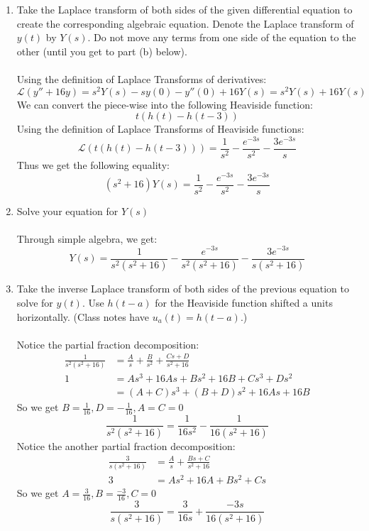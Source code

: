 \documentclass[12pt]{article}
\begin{document}
\begin{enumerate}[label = (\alph*)]
	\item Take the Laplace transform of both sides of the given differential equation to create the corresponding algebraic equation. Denote the Laplace transform of $y(t)$ by $Y(s)$. Do not move any terms from one side of the equation to the other (until you get to part (b) below).
	\\ \\
	Using the definition of Laplace Transforms of derivatives:
	$$
	\mathcal{L}(y'' + 16y) = s^2Y(s) - sy(0) - y''(0) + 16Y(s) = s^2Y(s) + 16Y(s)
	$$
	We can convert the piece-wise into the following Heaviside function:
	$$
	t(h(t) - h(t-3))
	$$
	Using the definition of Laplace Transforms of Heaviside functions:
	$$
	\mathcal{L}(t(h(t) - h(t-3))) = \frac{1}{s^2} - \frac{e^{-3s}}{s^2} - \frac{3e^{-3s}}{s}
	$$ 
	Thus we get the following equality:
	$$
	(s^2 + 16)Y(s) = \frac{1}{s^2} - \frac{e^{-3s}}{s^2} - \frac{3e^{-3s}}{s}
	$$
	\item Solve your equation for $Y(s)$
	\\ \\
	Through simple algebra, we get:
	$$
	Y(s) = \frac{1}{s^2(s^2 + 16)} - \frac{e^{-3s}}{s^2(s^2 + 16)} - \frac{3e^{-3s}}{s(s^2 + 16)}
	$$
	\newpage
	\item Take the inverse Laplace transform of both sides of the previous equation to solve for $y(t)$. Use $h(t-a)$ for the Heaviside function shifted a units horizontally. (Class notes have $u_a(t) = h(t-a)$.)
	\\ \\
	Notice the partial fraction decomposition:
	\begin{align*}
		\frac{1}{s^2(s^2 + 16)} &= \frac{A}{s} + \frac{B}{s^2} + \frac{Cs + D}{s^2+16} \\
		1 &= As^3 + 16As + Bs^2 + 16B + Cs^3 + Ds^2 \\
		&= (A+C)s^3 + (B+D)s^2 + 16As + 16B
	\end{align*}
	So we get $B = \frac{1}{16}, D = -\frac{1}{16}, A = C = 0$
	$$
	\frac{1}{s^2(s^2 + 16)} = \frac{1}{16s^2} - \frac{1}{16(s^2+16)}
	$$
	Notice the another partial fraction decomposition:
	\begin{align*}
		\frac{3}{s(s^2 + 16)} &= \frac{A}{s} + \frac{Bs + C}{s^2 + 16} \\
		3 &= As^2 + 16A + Bs^2 + Cs
	\end{align*}
	So we get $A = \frac{3}{16}, B = \frac{-3}{16}, C = 0$
		$$
		\frac{3}{s(s^2 + 16)} = \frac{3}{16s} + \frac{-3s}{16(s^2 + 16)}
$$
\end{enumerate}
\end{document}
